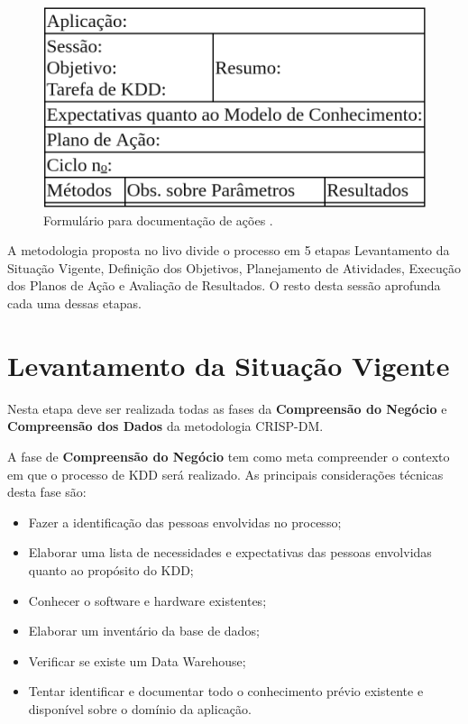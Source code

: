 \documentclass[diss,capa]{texufpel}
\begin{document}
\begin{figure}[htbp]
  \centering \includegraphics[scale=.4]{imagens/formulario-para-documentacao-de-acoes.png}
  \caption{Formulário para documentação de ações \cite{goldschmidt2015data}.}
  \label{fig:formulario-para-documentacao-de-acoes}
\end{figure}

A metodologia proposta no livo divide o processo em 5 etapas Levantamento da Situação Vigente, Definição dos Objetivos, Planejamento de Atividades, Execução dos Planos de Ação e Avaliação de Resultados. O resto desta sessão aprofunda cada uma dessas etapas.

\section{Levantamento da Situação Vigente}
\label{sec:levantamento-da-situacao-vigente}

Nesta etapa deve ser realizada todas as fases da \textbf{Compreensão do Negócio} e \textbf{Compreensão dos Dados} da metodologia CRISP-DM. 

A fase de \textbf{Compreensão do Negócio} tem como meta compreender o contexto em que o processo de KDD será realizado. As principais considerações técnicas desta fase são:
\begin{itemize}
\item Fazer a identificação das pessoas envolvidas no processo;
\item Elaborar uma lista de necessidades e expectativas das pessoas envolvidas quanto ao propósito do KDD;
\item Conhecer o software e hardware existentes;
\item Elaborar um inventário da base de dados;
\item Verificar se existe um Data Warehouse;
\item Tentar identificar e documentar todo o conhecimento prévio existente e disponível sobre o domínio da aplicação.
\end{itemize}
\end{document}
